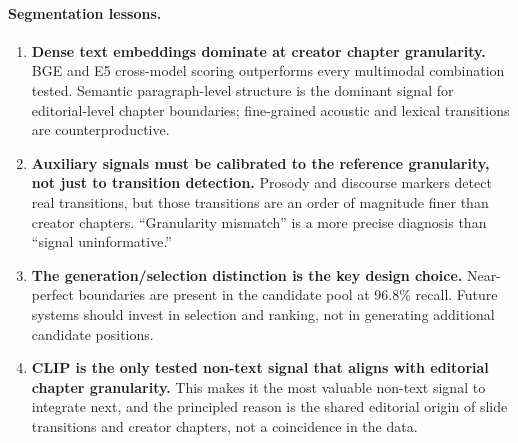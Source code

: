 \paragraph{Segmentation lessons.}
\begin{enumerate}
  \item \textbf{Dense text embeddings dominate at creator chapter granularity.}
    BGE and E5 cross-model scoring outperforms every multimodal combination
    tested.
    Semantic paragraph-level structure is the dominant signal for
    editorial-level chapter boundaries; fine-grained acoustic and lexical
    transitions are counterproductive.

  \item \textbf{Auxiliary signals must be calibrated to the reference
    granularity, not just to transition detection.}
    Prosody and discourse markers detect real transitions, but those transitions
    are an order of magnitude finer than creator chapters.
    ``Granularity mismatch'' is a more precise diagnosis than
    ``signal uninformative.''

  \item \textbf{The generation/selection distinction is the key design choice.}
    Near-perfect boundaries are present in the candidate pool at 96.8\% recall.
    Future systems should invest in selection and ranking, not in generating
    additional candidate positions.

  \item \textbf{CLIP is the only tested non-text signal that aligns with
    editorial chapter granularity.}
    This makes it the most valuable non-text signal to integrate next, and the
    principled reason is the shared editorial origin of slide transitions and
    creator chapters, not a coincidence in the data.
\end{enumerate}

